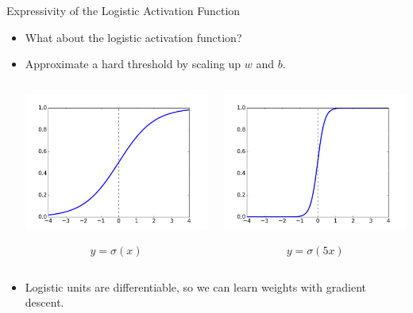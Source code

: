 \documentclass[handout,aspectratio=169]{beamer}
\begin{document}
\begin{frame}{Expressivity of the Logistic Activation Function}
  \begin{itemize}
    \item What about the logistic activation function?
    \item Approximate a hard threshold by scaling up $w$ and $b$.
      \begin{columns}
        \begin{column}{0.4 \textwidth}
          \begin{center}
            \includegraphics[width=0.8 \textwidth]{pics/scaling_1.png}
          \end{center}
          \[ y = \sigma(x) \]
        \end{column}
        \begin{column}{0.4 \textwidth}
          \begin{center}
            \includegraphics[width=0.8 \textwidth]{pics/scaling_5.png}
          \end{center}
          \[ y = \sigma(5x) \]
        \end{column}
      \end{columns}

      \vspace{0.5em}
    \pause
    \item Logistic units are differentiable, so we can learn weights with gradient descent.
  \end{itemize}
\end{frame}
\end{document}

